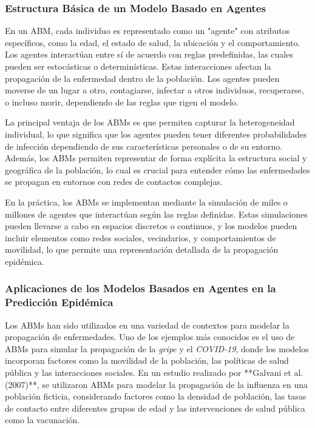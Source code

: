 \subsubsection{Estructura Básica de un Modelo Basado en Agentes}

En un ABM, cada individuo es representado como un "agente" con atributos específicos, como la edad, el estado de salud, la ubicación y el comportamiento. Los agentes interactúan entre sí de acuerdo con reglas predefinidas, las cuales pueden ser estocásticas o determinísticas. Estas interacciones afectan la propagación de la enfermedad dentro de la población. Los agentes pueden moverse de un lugar a otro, contagiarse, infectar a otros individuos, recuperarse, o incluso morir, dependiendo de las reglas que rigen el modelo.

La principal ventaja de los ABMs es que permiten capturar la heterogeneidad individual, lo que significa que los agentes pueden tener diferentes probabilidades de infección dependiendo de sus características personales o de su entorno. Además, los ABMs permiten representar de forma explícita la estructura social y geográfica de la población, lo cual es crucial para entender cómo las enfermedades se propagan en entornos con redes de contactos complejas.

En la práctica, los ABMs se implementan mediante la simulación de miles o millones de agentes que interactúan según las reglas definidas. Estas simulaciones pueden llevarse a cabo en espacios discretos o continuos, y los modelos pueden incluir elementos como redes sociales, vecindarios, y comportamientos de movilidad, lo que permite una representación detallada de la propagación epidémica.

\subsubsection{Aplicaciones de los Modelos Basados en Agentes en la Predicción Epidémica}

Los ABMs han sido utilizados en una variedad de contextos para modelar la propagación de enfermedades. Uno de los ejemplos más conocidos es el uso de ABMs para simular la propagación de la \textit{gripe} y el \textit{COVID-19}, donde los modelos incorporan factores como la movilidad de la población, las políticas de salud pública y las interacciones sociales. En un estudio realizado por **Galvani et al. (2007)**, se utilizaron ABMs para modelar la propagación de la influenza en una población ficticia, considerando factores como la densidad de población, las tasas de contacto entre diferentes grupos de edad y las intervenciones de salud pública como la vacunación.

